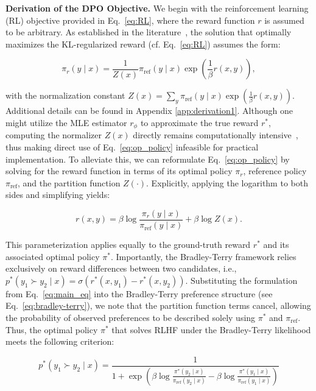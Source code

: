 \textbf{Derivation of the DPO Objective.} We begin with the reinforcement learning (RL) objective provided in Eq.~\ref{eq:RL}, where the reward function $r$ is assumed to be arbitrary. As established in the literature~\citep{peters2007reinforcement, peng2019advantage, korbak2022reinforcement, go2023aligning}, the solution that optimally maximizes the KL-regularized reward (cf. Eq.~\ref{eq:RL}) assumes the form:

\begin{equation}\label{eq:op_policy}
    \pi_r(y\mid x) = \frac{1}{Z(x)}\pi_\text{ref}(y\mid x)\exp\left(\frac{1}{\beta}r(x, y)\right),
\end{equation}

with the normalization constant $Z(x) =\sum_{y}\pi_\text{ref}(y\mid x)\exp\left(\frac{1}{\beta}r(x, y)\right)$. Additional details can be found in Appendix \ref{app:derivation1}. Although one might utilize the MLE estimator $r_{\phi}$ to approximate the true reward $r^*$, computing the normalizer $Z(x)$ directly remains computationally intensive~\citep{korbak2022reinforcement, go2023aligning}, thus making direct use of Eq.~\ref{eq:op_policy} infeasible for practical implementation. To alleviate this, we can reformulate Eq.~\ref{eq:op_policy} by solving for the reward function in terms of its optimal policy $\pi_r$, reference policy $\pi_\text{ref}$, and the partition function $Z(\cdot)$. Explicitly, applying the logarithm to both sides and simplifying yields:

\begin{equation}\label{eq:main_eq}
    r(x,y) =\beta \log \frac{\pi_r(y\mid x)}{\pi_\text{ref}(y\mid x)} + \beta \log Z(x).
\end{equation}

This parameterization applies equally to the ground-truth reward $r^*$ and its associated optimal policy $\pi^*$. Importantly, the Bradley-Terry framework relies exclusively on reward differences between two candidates, i.e., ${p^*(y_1 \succ y_2 \mid x) = \sigma(r^*(x, y_1) - r^*(x, y_2))}$. Substituting the formulation from Eq.~\ref{eq:main_eq} into the Bradley-Terry preference structure (see Eq.~\ref{eq:bradley-terry}), we note that the partition function terms cancel, allowing the probability of observed preferences to be described solely using $\pi^*$ and $\pi_\text{ref}$. Thus, the optimal policy $\pi^*$ that solves RLHF under the Bradley-Terry likelihood meets the following criterion:

\begin{equation}\label{eq:objective}
    p^*(y_1\succ y_2 \mid x)=\frac{1}{1 + \exp\left(\beta \log \frac{\pi^*(y_2\mid x)}{\pi_\text{ref}(y_2\mid x)} - \beta \log \frac{\pi^*(y_1\mid x)}{\pi_\text{ref}(y_1\mid x)}\right)}
\end{equation}

